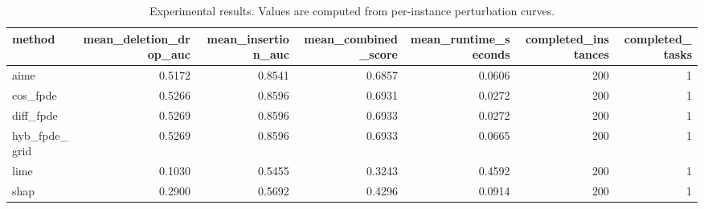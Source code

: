\begin{table}[t]
\caption{Experimental results. Values are computed from per-instance perturbation curves.}
\label{tab:main_results_computed}
\centering
\begin{tabular}{lrrrrrr}
\toprule
method & mean\_deletion\_drop\_auc & mean\_insertion\_auc & mean\_combined\_score & mean\_runtime\_seconds & completed\_instances & completed\_tasks \\
\midrule
aime & 0.5172 & 0.8541 & 0.6857 & 0.0606 & 200 & 1 \\
cos\_fpde & 0.5266 & 0.8596 & 0.6931 & 0.0272 & 200 & 1 \\
diff\_fpde & 0.5269 & 0.8596 & 0.6933 & 0.0272 & 200 & 1 \\
hyb\_fpde\_grid & 0.5269 & 0.8596 & 0.6933 & 0.0665 & 200 & 1 \\
lime & 0.1030 & 0.5455 & 0.3243 & 0.4592 & 200 & 1 \\
shap & 0.2900 & 0.5692 & 0.4296 & 0.0914 & 200 & 1 \\
\bottomrule
\end{tabular}

\end{table}
